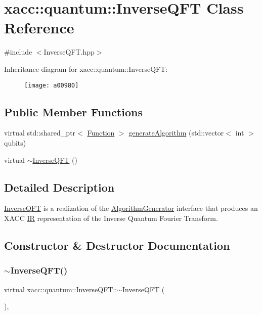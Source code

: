 \hypertarget{a00980}{}\section{xacc\+:\+:quantum\+:\+:Inverse\+Q\+FT Class Reference}
\label{a00980}


{\ttfamily \#include $<$Inverse\+Q\+F\+T.\+hpp$>$}

Inheritance diagram for xacc\+:\+:quantum\+:\+:Inverse\+Q\+FT\+:\begin{figure}[H]
\begin{center}
\leavevmode
\texttt{[image: a00980]}
\end{center}
\end{figure}
\subsection*{Public Member Functions}
\begin{DoxyCompactItemize}
\item 
virtual std\+::shared\+\_\+ptr$<$ \hyperlink{a01124}{Function} $>$ \hyperlink{a00980_af42e466bf02dbd60670d20aa55cfb08d}{generate\+Algorithm} (std\+::vector$<$ int $>$ qubits)
\item 
virtual \hyperlink{a00980_a731c10d28046424be74e4c0daa31d016}{$\sim$\+Inverse\+Q\+FT} ()
\end{DoxyCompactItemize}


\subsection{Detailed Description}
\hyperlink{a00980}{Inverse\+Q\+FT} is a realization of the \hyperlink{a01116}{Algorithm\+Generator} interface that produces an X\+A\+CC \hyperlink{a01148}{IR} representation of the Inverse Quantum Fourier Transform. 

\subsection{Constructor \& Destructor Documentation}
\mbox{\label{a00980_a731c10d28046424be74e4c0daa31d016}} 
\subsubsection{\texorpdfstring{$\sim$\+Inverse\+Q\+F\+T()}{~InverseQFT()}}
{\footnotesize\ttfamily virtual xacc\+::quantum\+::\+Inverse\+Q\+F\+T\+::$\sim$\+Inverse\+Q\+FT (\begin{DoxyParamCaption}{ }\end{DoxyParamCaption})\hspace{0.3cm}{\ttfamily [inline]}, {\ttfamily [virtual]}}

